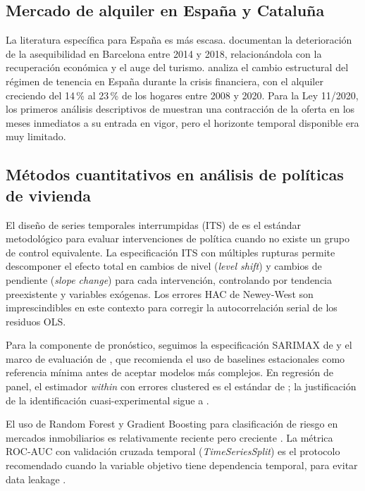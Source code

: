 \documentclass[12pt,a4paper]{article}
\begin{document}
\subsection{Mercado de alquiler en España y Cataluña}

La literatura específica para España es más escasa. \citet{garcia2018housing}
documentan la deterioración de la asequibilidad en Barcelona entre 2014 y 2018,
relacionándola con la recuperación económica y el auge del turismo. \citet{modenes2021alquiler}
analiza el cambio estructural del régimen de tenencia en España durante la crisis
financiera, con el alquiler creciendo del 14\,\% al 23\,\% de los hogares entre 2008
y 2020. Para la Ley 11/2020, los primeros análisis descriptivos de \citet{bosch2021ley11}
muestran una contracción de la oferta en los meses inmediatos a su entrada en vigor,
pero el horizonte temporal disponible era muy limitado.

\subsection{Métodos cuantitativos en análisis de políticas de vivienda}

El diseño de series temporales interrumpidas (ITS) de \citet{wagner2002its} es el
estándar metodológico para evaluar intervenciones de política cuando no existe un
grupo de control equivalente. La especificación ITS con múltiples rupturas permite
descomponer el efecto total en cambios de nivel (\textit{level shift}) y cambios de
pendiente (\textit{slope change}) para cada intervención, controlando por tendencia
preexistente y variables exógenas. Los errores HAC de Newey-West \citep{newey1987hac}
son imprescindibles en este contexto para corregir la autocorrelación serial de los
residuos OLS.

Para la componente de pronóstico, seguimos la especificación SARIMAX de \citet{box2015timeseries}
y el marco de evaluación de \citet{hyndman2021forecasting}, que recomienda el uso de
baselines estacionales como referencia mínima antes de aceptar modelos más complejos.
En regresión de panel, el estimador \textit{within} con errores clustered es el
estándar de \citet{baltagi2021econometric}; la justificación de la identificación
cuasi-experimental sigue a \citet{angrist2009mostly}.

El uso de Random Forest y Gradient Boosting para clasificación de riesgo en mercados
inmobiliarios es relativamente reciente pero creciente \citep{genesove2012behavioral}.
La métrica ROC-AUC con validación cruzada temporal (\textit{TimeSeriesSplit}) es el
protocolo recomendado cuando la variable objetivo tiene dependencia temporal, para
evitar data leakage \citep{bergmeir2018note}.
\end{document}
